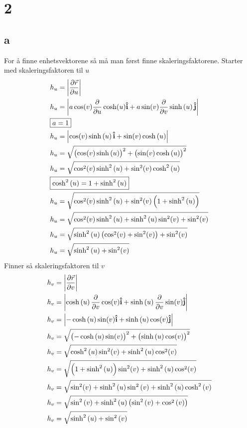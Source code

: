\documentclass[a4paper,10pt,norsk]{article}
\newcommand{\uvec}[1]{\boldsymbol{\hat{\textbf{#1}}}}
\begin{document}
\section*{2}
	\subsection*{a}
	For å finne enhetsvektorene så må man først finne skaleringsfaktorene. Starter med skaleringsfaktoren til $u$
	\begin{align*}
		&h_u = \abs{\frac{\partial \vec{r} }{\partial u} }\\
		&h_u = \abs{a \cos(v) \frac{\partial }{\partial u} \cosh(u) \uvec{i} + a \sin(v) \frac{\partial }{\partial v} \sinh \left( u \right) \uvec{j}}\\
		&\boxed{a = 1}\\
		&h_u = \abs{\cos(v) \sinh \left( u \right) \uvec{i} + \sin(v)  \cosh \left( u \right) }\\
		&h_u = \sqrt{\left( \cos(v) \sinh \left( u \right)  \right)^2 + \left( \sin(v) \cosh \left( u \right)  \right) ^2 }\\
		&h_u = \sqrt{\cos^2(v)\sinh^2 \left( u \right) + \sin^2(v) \cosh^2 \left( u \right)   }\\
		&\boxed{\cosh^2 \left( u \right) = 1 + \sinh^2 \left( u \right) }\\
		&h_u = \sqrt{\cos^2(v) \sinh^2 \left( u \right) + \sin^2(v) \left( 1 + \sinh^2 \left( u  \right)  \right)  }\\
		&h_u = \sqrt{\cos^2(v) \sinh^2 \left( u  \right) + \sinh ^2\left( u \right) \sin^2(v) + \sin^2(v)   }\\
		&h_u = \sqrt{\sinh ^2\left( u \right) \left( \cos^2(v) + \sin^2(v)  \right) + \sin^2(v) }\\
		&h_u = \sqrt{\sinh^2 \left( u \right) + \sin^2(v)  }
	\end{align*}
	Finner så skaleringsfaktoren til $v$
	 \begin{align*}
		&h_v = \abs{\frac{\partial \vec{r} }{\partial v} }\\
		&h_v = \abs{\cosh \left( u \right) \frac{\partial }{\partial v} \cos(v) \uvec{i} + \sinh \left( u \right) \frac{\partial }{\partial v} \sin(v)  \uvec{j}}\\
		&h_v = \abs{- \cosh \left( u \right) \sin(v)  \uvec{i} + \sinh \left( u \right) \cos(v) \uvec{j}}\\
		&h_v = \sqrt{\left( - \cosh \left( u \right) \sin(v)  \right) ^2 + \left( \sinh \left( u \right) \cos(v)  \right) ^2}\\
		&h_v = \sqrt{\cosh^2 \left( u \right) \sin^2(v) + \sinh^2 \left( u \right) \cos^2(v) }\\
		&h_v = \sqrt{\left( 1 + \sinh^2 \left( u \right)  \right) \sin^2(v) + \sinh ^2\left( u \right) \cos^2(v)  }\\
		&h_v = \sqrt{\sin^2(v) + \sinh^2 \left( u \right) \sin^2 \left( v \right) + \sinh^2 \left( u \right) \cosh^2 \left( v \right)  }\\
		&h_v = \sqrt{\sin^2 \left( v \right) + \sinh^2 \left( u \right) \left( \sin^2 \left( v \right) + \cos^2 \left( v \right)  \right) }\\
		&h_v = \sqrt{\sinh^2 \left( u \right) + \sin^2 \left( v \right) }
	\end{align*}
\end{document}
